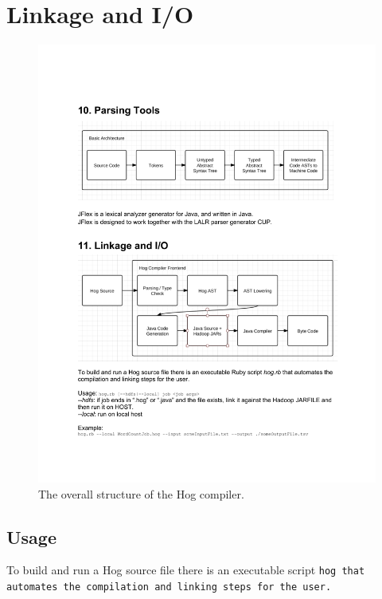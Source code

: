 \documentclass{article}
\begin{document}

\section{Linkage and I/O} %
\label{sec:linkage_and_i_o}

\begin{center}
\begin{figure}
  \label{fig:hog_compiler}
  \includegraphics[width=1.0\textwidth]{img/hog_compiler.pdf}
  \caption{The overall structure of the Hog compiler.}
\end{figure}
\end{center}

\subsection{Usage} %
\label{sub:usage}


To build and run a Hog source file there is an executable script \tt hog
\rm that automates the compilation and linking steps for the user.
\end{document}
